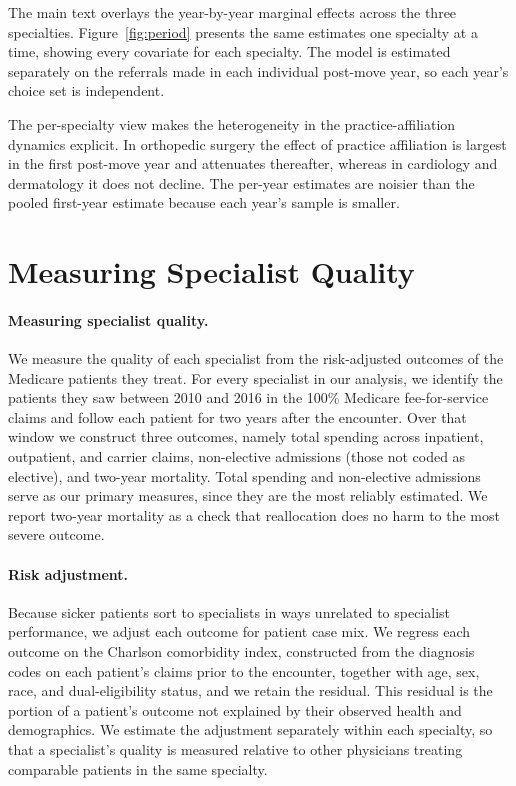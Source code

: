 \documentclass[12pt]{article}
\begin{document}
The main text overlays the year-by-year marginal effects across the three specialties. Figure~\ref{fig:period} presents the same estimates one specialty at a time, showing every covariate for each specialty. The model is estimated separately on the referrals made in each individual post-move year, so each year's choice set is independent.

The per-specialty view makes the heterogeneity in the practice-affiliation dynamics explicit. In orthopedic surgery the effect of practice affiliation is largest in the first post-move year and attenuates thereafter, whereas in cardiology and dermatology it does not decline. The per-year estimates are noisier than the pooled first-year estimate because each year's sample is smaller.


\section{Measuring Specialist Quality}
\label{sec:welfare}

\paragraph{Measuring specialist quality.} We measure the quality of each specialist from the risk-adjusted outcomes of the Medicare patients they treat. For every specialist in our analysis, we identify the patients they saw between 2010 and 2016 in the 100\% Medicare fee-for-service claims and follow each patient for two years after the encounter. Over that window we construct three outcomes, namely total spending across inpatient, outpatient, and carrier claims, non-elective admissions (those not coded as elective), and two-year mortality. Total spending and non-elective admissions serve as our primary measures, since they are the most reliably estimated. We report two-year mortality as a check that reallocation does no harm to the most severe outcome.

\paragraph{Risk adjustment.} Because sicker patients sort to specialists in ways unrelated to specialist performance, we adjust each outcome for patient case mix. We regress each outcome on the Charlson comorbidity index, constructed from the diagnosis codes on each patient's claims prior to the encounter, together with age, sex, race, and dual-eligibility status, and we retain the residual. This residual is the portion of a patient's outcome not explained by their observed health and demographics. We estimate the adjustment separately within each specialty, so that a specialist's quality is measured relative to other physicians treating comparable patients in the same specialty.
\end{document}
